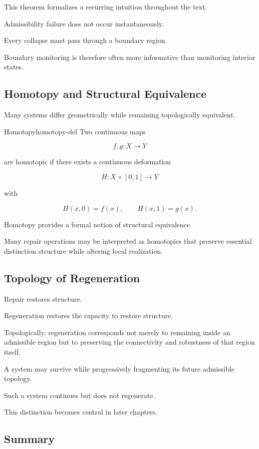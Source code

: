 \documentclass[12pt,twoside,openright]{book}
\begin{document}
This theorem formalizes a recurring intuition throughout
the text.

Admissibility failure does not occur instantaneously.

Every collapse must pass through a boundary region.

Boundary monitoring is therefore often more informative
than monitoring interior states.

\subsection{Homotopy and Structural Equivalence}

Many systems differ geometrically while remaining
topologically equivalent.

\begin{definition}{Homotopy}{homotopy-def}
Two continuous maps

\[
f,g:X\rightarrow Y
\]

are homotopic if there exists a continuous deformation

\[
H:X\times[0,1]\rightarrow Y
\]

with

\[
H(x,0)=f(x),
\qquad
H(x,1)=g(x).
\]
\end{definition}

Homotopy provides a formal notion of structural
equivalence.

Many repair operations may be interpreted as homotopies
that preserve essential distinction structure while
altering local realization.

\subsection{Topology of Regeneration}

Repair restores structure.

Regeneration restores the capacity to restore structure.

Topologically, regeneration corresponds not merely to
remaining inside an admissible region but to preserving
the connectivity and robustness of that region itself.

A system may survive while progressively fragmenting its
future admissible topology.

Such a system continues but does not regenerate.

This distinction becomes central in later chapters.

\subsection{Summary}
\end{document}
